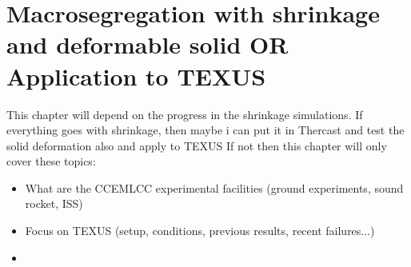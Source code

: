 \chapter{Macrosegregation with shrinkage and deformable solid OR Application to TEXUS}
\begin{nolinkcolors} 
\minitoc
\end{nolinkcolors}
\newpage

This chapter will depend on the progress in the shrinkage simulations.
If everything goes with shrinkage, then maybe i can put it in Thercast and test the solid deformation also and apply to TEXUS
If not then this chapter will only cover these topics:
\begin{itemize}
\item What are the CCEMLCC experimental facilities (ground experiments, sound rocket, ISS)
\item Focus on TEXUS (setup, conditions, previous results, recent failures...)
\item 

\end{itemize}